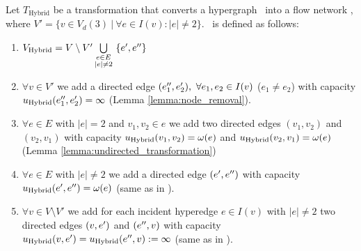 \begin{definition}
Let $T_{\text{Hybrid}}$ be a transformation that converts a hypergraph \HypergraphDef~into 
a flow network \Hybrid, where $V' = \{v \in V_d(3)\ |\ \forall e \in I(v): |e| \neq 2\}$. 
\ShortHybrid~is defined as follows:
\begin{enumerate}
\item $V_{\text{Hybrid}} = V\setminus V' \bigcup\limits_{\substack{e \in E \\ |e| \neq 2}}\ \{e', e''\}$
\item $\forall v \in V'$ we add a directed edge $(e_1'', e_2'),\ \forall e_1, e_2 \in I(v)$ 
      ($e_1 \neq e_2$) with capacity $u_{\text{Hybrid}}(e_1'', e_2') = \infty$ (Lemma \ref{lemma:node_removal}).
\item $\forall e \in E$ with $|e| = 2$ and $v_1,v_2 \in e$ we add 
      two directed edges $(v_1,v_2)$ and $(v_2,v_1)$ with capacity $u_{\text{Hybrid}}(v_1,v_2) = \omega(e)$
      and $u_{\text{Hybrid}}(v_2,v_1) = \omega(e)$ (Lemma \ref{lemma:undirected_transformation})
\item $\forall e \in E$ with $|e| \neq 2$ we add a directed edge $(e',e'')$
      with capacity $u_{\text{Hybrid}}(e',e'') = \omega(e)$ (same as in ).
\item $\forall v \in V\setminus V'$ we add for each incident hyperedge $e \in I(v)$ with $|e| \neq 2$ 
      two directed edges $(v,e')$ and $(e'',v)$ with capacity 
      $u_{\text{Hybrid}}(v,e') = u_{\text{Hybrid}}(e'',v) := \infty$ (same as in ).
\end{enumerate} 
\end{definition}


